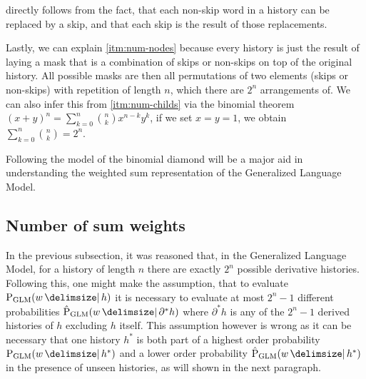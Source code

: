  directly follows from the fact, that each non-skip word
in a history can be replaced by a skip, and that each skip is the result
of those replacements.

Lastly, we can explain \cref{itm:num-nodes} because every history is just the
result of laying a mask that is a combination of skips or non-skips on top of
the original history.
All possible masks are then all permutations of two elements (skips or
non-skips) with repetition of length $n$, which there are $2^n$ arrangements of.
We can also infer this from \cref{itm:num-childs} via the binomial theorem
$(x+ y)^n = \sum_{k=0}^n \binom{n}{k} x^{n-k} y^k$, if we set ${x = y = 1}$,
we obtain $\sum_{k=0}^n \binom{n}{k} = 2^n$.

Following the model of the binomial diamond will be a major aid in understanding
the weighted sum representation of the Generalized Language Model.


\subsection{Number of sum weights}

In the previous subsection, it was reasoned that, in the Generalized Language
Model, for a history of length $n$ there are exactly $2^n$ possible derivative
histories.
Following this, one might make the assumption, that to evaluate $\ProbGLM{w}{h}$
it is necessary to evaluate at most $2^n - 1$  different probabilities
$\ProbGLM*{w}{\partial^* h}$ where $\partial^* h$ is any of the $2^n - 1$
derived histories of $h$ excluding $h$ itself.
This assumption however is wrong as it can be necessary that one history $h^*$
is both part of a highest order probability $\ProbGLM{w}{h^*}$ and a lower order
probability $\ProbGLM*{w}{h^*}$ in the presence of unseen histories, as will
shown in the next paragraph.

